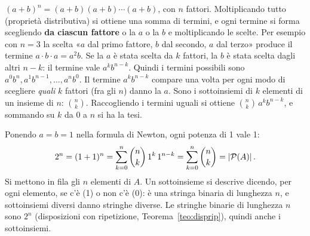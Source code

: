 \begin{dimostrazione}
 $(a + b)^n = (a + b)(a + b) \cdots (a + b)$, con $n$ fattori.
 Moltiplicando tutto (proprietà distributiva) si ottiene una somma di termini, e
ogni termine si forma scegliendo \textbf{da ciascun fattore} o la $a$ o la $b$ e moltiplicando le scelte. Per esempio
con $n = 3$ la scelta «$a$ dal primo fattore, $b$ dal secondo, $a$ dal terzo» produce il termine $a \cdot b \cdot a =
a^2 b$.
 Se la $a$ è stata scelta da $k$ fattori, la $b$ è stata scelta dagli altri $n - k$:
il termine vale $a^k b^{n-k}$. Quindi i termini possibili sono $a^0 b^n, a^1 b^{n-1}, \ldots, a^n b^0$.
 Il termine $a^k b^{n-k}$ compare una volta per ogni modo di scegliere
\emph{quali} $k$ fattori (fra gli $n$) danno la $a$. Sono i sottoinsiemi di $k$ elementi di un insieme di $n$:
$\binom{n}{k}$. Raccogliendo i termini uguali si ottiene $\binom{n}{k}\, a^k b^{n-k}$, e sommando su $k$ da 0 a $n$ si
ha la tesi.
\end{dimostrazione}


\begin{dimostrazione}
 Ponendo $a = b = 1$ nella formula di Newton, ogni potenza di 1 vale 1:
\[ 2^n = (1 + 1)^n = \sum_{k=0}^{n} \binom{n}{k}\, 1^k\, 1^{n-k} = \sum_{k=0}^{n} \binom{n}{k} = \left\lvert \mathcal{P}(A) \right\rvert . \]
 Si mettono in fila gli $n$ elementi di $A$. Un sottoinsieme si descrive dicendo, per
ogni elemento, se c'è (1) o non c'è (0): è una stringa binaria di lunghezza $n$, e sottoinsiemi diversi danno
stringhe diverse. Le stringhe binarie di lunghezza $n$ sono $2^n$ (disposizioni con ripetizione, Teorema~\ref{teo:disprip}),
quindi anche i sottoinsiemi.
\end{dimostrazione}

